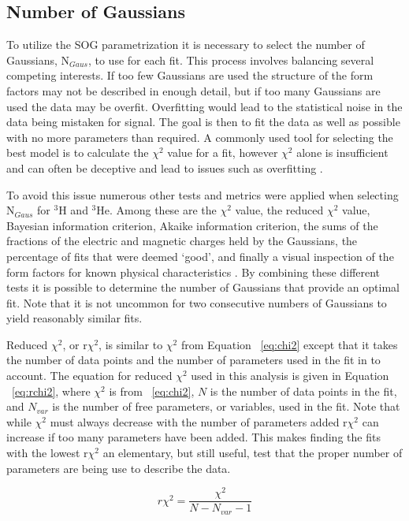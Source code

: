 \subsection{Number of Gaussians}
\label{ssec:ngaus}

To utilize the SOG parametrization it is necessary to select the number of Gaussians, N$_{Gaus}$, to use for each fit. This process involves balancing several competing interests. If too few Gaussians are used the structure of the form factors may not be described in enough detail, but if too many Gaussians are used the data may be overfit. Overfitting would lead to the statistical noise in the data being mistaken for signal. The goal is then to fit the data as well as possible with no more parameters than required. A commonly used tool for selecting the best model is to calculate the $\chi^2$ value for a fit, however $\chi^2$ alone is insufficient and can often be deceptive and lead to issues such as overfitting \cite{doug_stats}. 

To avoid this issue numerous other tests and metrics were applied when selecting N$_{Gaus}$ for $^3$H and $^3$He. Among these are the $\chi^2$ value, the reduced $\chi^2$ value, Bayesian information criterion, Akaike information criterion, the sums of the fractions of the electric and magnetic charges held by the Gaussians, the percentage of fits that were deemed `good', and finally a visual inspection of the form factors for known physical characteristics \cite{doug_stats}. By combining these different tests it is possible to determine the number of Gaussians that provide an optimal fit. Note that it is not uncommon for two consecutive numbers of Gaussians to yield reasonably similar fits.

Reduced $\chi^2$, or r$\chi^2$, is similar to $\chi^2$ from Equation ~\ref{eq:chi2} except that it takes the number of data points and the number of parameters used in the fit in to account. The equation for reduced $\chi^2$ used in this analysis is given in Equation ~\ref{eq:rchi2}, where $\chi^2$ is from ~\ref{eq:chi2}, $N$ is the number of data points in the fit, and $N_{var}$ is the number of free parameters, or variables, used in the fit. Note that while $\chi^2$ must always decrease with the number of parameters added r$\chi^2$ can increase if too many parameters have been added. This makes finding the fits with the lowest r$\chi^2$ an elementary, but still useful, test that the proper number of parameters are being use to describe the data.

\begin{equation} \label{eq:rchi2}
	r\chi^2 = \frac{\chi^2}{N-N_{var}-1}
\end{equation}

